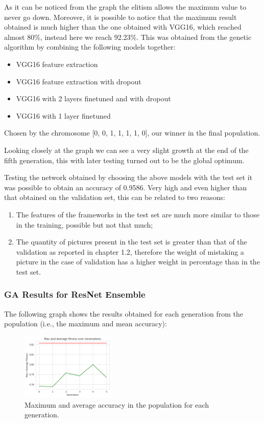 As it can be noticed from the graph the elitism allows the maximum value to never go down. Moreover, it is possible to notice that the maximum result obtained is much higher than the one obtained with VGG16, which reached almost 80\%, instead here we reach 92.23\%. This was obtained from the genetic algorithm by combining the following models together:
 \begin{itemize}
	\item VGG16 feature extraction
	\item VGG16 feature extraction with dropout
	\item VGG16 with 2 layers finetuned and with dropout
         \item VGG16 with 1 layer finetuned
\end{itemize}
Chosen by the chromosome [0, 0, 1, 1, 1, 1, 0], our winner in the final population.

Looking closely at the graph we can see a very slight growth at the end of the fifth generation, this with later testing turned out to be the global optimum.

Testing the network obtained by choosing the above models with the test set it was possible to obtain an accuracy of 0.9586. Very high and even higher than that obtained on the validation set, this can be related to two reasons:

\begin{enumerate}
	\item The features of the frameworks in the test set are much more similar to those in the training, possible but not that much;
	\item The quantity of pictures present in the test set is greater than that of the validation as reported in chapter 1.2, therefore the weight of mistaking a picture in the case of validation has a higher weight in percentage than in the test set.
\end{enumerate}




\subsubsection{GA Results for ResNet Ensemble}
The following graph shows the results obtained for each generation from the population (i.e., the maximum and mean accuracy):

\begin{figure}[H]
	\centering
	\includegraphics[width=0.4\textwidth]{img/ensemble/resnet.png}
	\caption{Maximum and average accuracy in the population for each generation.}
	\label{fig:ensembleresnet}
\end{figure}

